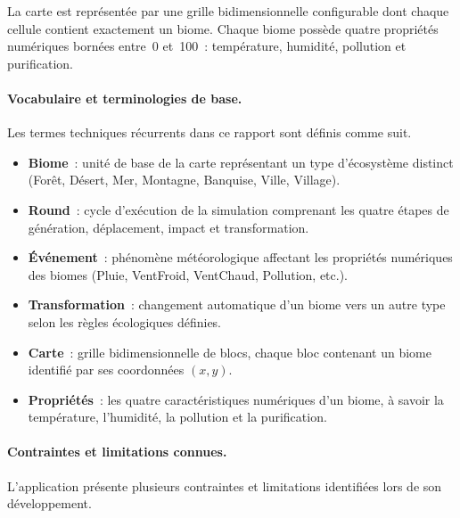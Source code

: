 La carte est représentée par une grille bidimensionnelle configurable dont chaque
cellule contient exactement un biome. Chaque biome possède quatre propriétés
numériques bornées entre~0 et~100~: température, humidité, pollution et
purification.

\paragraph{Vocabulaire et terminologies de base.}
Les termes techniques récurrents dans ce rapport sont définis comme suit.

\begin{itemize}
  \item \textbf{Biome}~: unité de base de la carte représentant un type
    d'écosystème distinct (Forêt, Désert, Mer, Montagne, Banquise, Ville,
    Village).
  \item \textbf{Round}~: cycle d'exécution de la simulation comprenant les quatre
    étapes de génération, déplacement, impact et transformation.
  \item \textbf{Événement}~: phénomène météorologique affectant les propriétés
    numériques des biomes (Pluie, VentFroid, VentChaud, Pollution, etc.).
  \item \textbf{Transformation}~: changement automatique d'un biome vers un autre
    type selon les règles écologiques définies.
  \item \textbf{Carte}~: grille bidimensionnelle de blocs, chaque bloc contenant
    un biome identifié par ses coordonnées $(x, y)$.
  \item \textbf{Propriétés}~: les quatre caractéristiques numériques d'un biome,
    à savoir la température, l'humidité, la pollution et la purification.
\end{itemize}

\paragraph{Contraintes et limitations connues.}
L'application présente plusieurs contraintes et limitations identifiées lors de son développement.

